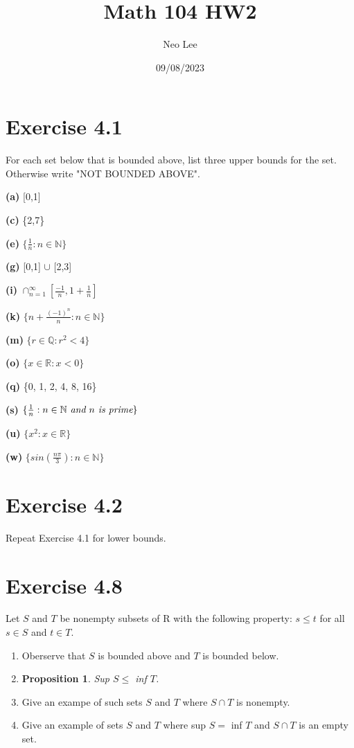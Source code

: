 \documentclass{article}
\title{Math 104 HW2}
\author{Neo Lee}
\date{09/08/2023}
\newtheorem{proposition}[thm]{Proposition}
\begin{document}
 

\maketitle 

\section*{Exercise 4.1}
For each set below that is bounded above, list three upper bounds for the set. Otherwise write 
"NOT BOUNDED ABOVE". 

\textbf{(a)} [0,1]

\textbf{(c)} \{2,7\}

\textbf{(e)} $\{\frac{1}{n}:n\in\mathbb{N}\}$

\textbf{(g)} [0,1] $\cup$ [2,3]

\textbf{(i)} $\cap^\infty_{n=1}\left[\frac{-1}{n}, 1+\frac{1}{n}\right]$

\textbf{(k)} $\{n+\frac{(-1)^n}{n}:n\in\mathbb{N}\}$

\textbf{(m)} $\{r\in\mathbb{Q}:r^2<4\}$

\textbf{(o)} $\{x\in\mathbb{R}:x<0\}$

\textbf{(q)} \{0, 1, 2, 4, 8, 16\}

\textbf{(s)} $\{\frac{1}{n}:n\in\mathbb{N} \emph{ and } n \emph{ is prime}\}$

\textbf{(u)} $\{x^2:x\in\mathbb{R}\}$

\textbf{(w)} $\{sin\left(\frac{n\pi}{3}\right):n\in\mathbb{N}\}$

\section*{Exercise 4.2}
Repeat Exercise 4.1 for lower bounds.

\section*{Exercise 4.8}
Let $S$ and $T$ be nonempty subsets of R with the following property: $s\le t$ for all $s\in S$ and 
$t\in T$.
\begin{enumerate}[label=(\alph*)]
    \item Oberserve that $S$ is bounded above and $T$ is bounded below. 
    \item \begin{proposition}
        Sup $S\le$ inf $T$.
    \end{proposition}
    \item Give an exampe of such sets $S$ and $T$ where $S\cap T$ is nonempty.
    \item Give an example of sets $S$ and $T$ where sup $S=$ inf $T$ and $S\cap T$ is an empty set.
\end{enumerate}
\end{document}

